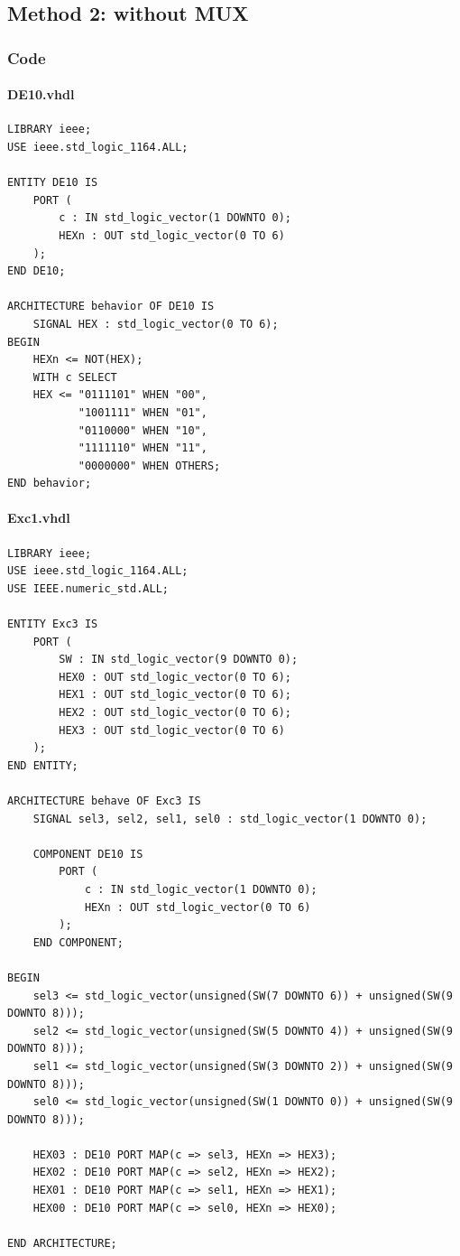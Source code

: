 \documentclass[13pt,a4paper]{report}
\begin{document}
\subsection{Method 2: without MUX}
\subsubsection{Code}
\paragraph{DE10.vhdl}
\begin{verbatim}
LIBRARY ieee;
USE ieee.std_logic_1164.ALL;

ENTITY DE10 IS
	PORT (
		c : IN std_logic_vector(1 DOWNTO 0);
		HEXn : OUT std_logic_vector(0 TO 6)
	);
END DE10;

ARCHITECTURE behavior OF DE10 IS
	SIGNAL HEX : std_logic_vector(0 TO 6);
BEGIN
	HEXn <= NOT(HEX);
	WITH c SELECT
	HEX <= "0111101" WHEN "00", 
	       "1001111" WHEN "01", 
	       "0110000" WHEN "10", 
	       "1111110" WHEN "11", 
	       "0000000" WHEN OTHERS;
END behavior;
\end{verbatim}

\paragraph{Exc1.vhdl}
\begin{verbatim}
LIBRARY ieee;
USE ieee.std_logic_1164.ALL;
USE IEEE.numeric_std.ALL;

ENTITY Exc3 IS
	PORT (
		SW : IN std_logic_vector(9 DOWNTO 0);
		HEX0 : OUT std_logic_vector(0 TO 6);
		HEX1 : OUT std_logic_vector(0 TO 6);
		HEX2 : OUT std_logic_vector(0 TO 6);
		HEX3 : OUT std_logic_vector(0 TO 6)
	);
END ENTITY;

ARCHITECTURE behave OF Exc3 IS
	SIGNAL sel3, sel2, sel1, sel0 : std_logic_vector(1 DOWNTO 0);
 
	COMPONENT DE10 IS
		PORT (
			c : IN std_logic_vector(1 DOWNTO 0);
			HEXn : OUT std_logic_vector(0 TO 6)
		);
	END COMPONENT;

BEGIN
	sel3 <= std_logic_vector(unsigned(SW(7 DOWNTO 6)) + unsigned(SW(9 DOWNTO 8)));
	sel2 <= std_logic_vector(unsigned(SW(5 DOWNTO 4)) + unsigned(SW(9 DOWNTO 8)));
	sel1 <= std_logic_vector(unsigned(SW(3 DOWNTO 2)) + unsigned(SW(9 DOWNTO 8)));
	sel0 <= std_logic_vector(unsigned(SW(1 DOWNTO 0)) + unsigned(SW(9 DOWNTO 8)));
 
	HEX03 : DE10 PORT MAP(c => sel3, HEXn => HEX3);
	HEX02 : DE10 PORT MAP(c => sel2, HEXn => HEX2);
	HEX01 : DE10 PORT MAP(c => sel1, HEXn => HEX1);
	HEX00 : DE10 PORT MAP(c => sel0, HEXn => HEX0);

END ARCHITECTURE;
\end{verbatim}
\end{document}
